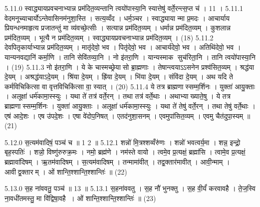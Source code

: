 5.11.0
स्वाद्ध्यायप्रवचनाभ्यान्न प्रम॑दित॒व्यन्तानि त्वयो॑पास्या॒नि स्यात्तेषु॑ वर्ते॒रन्त्स॒प्त च॑ । 11 ।
5.11.1
वेदमनूच्याचार्योऽन्तेवासिनम॑नुशा॒स्ति । सत्य॒व्वँद । धर्म॒ञ्चर । स्वाद्ध्यायान्मा प्र॒मदः । आचार्याय प्रियन्धनमाहृत्य प्रजातन्तुं मा व्य॑वच्छे॒त्सीः । सत्यान्न प्रम॑दित॒व्यम् । धर्मान्न प्रम॑दित॒व्यम् । कुशलान्न प्रम॑दित॒व्यम् । भूत्यै न प्रम॑दित॒व्यम् । स्वाद्ध्यायप्रवचनाभ्यान्न प्रम॑दित॒व्यम् । (18)
5.11.2
देवपितृकार्याभ्यान्न प्रम॑दित॒व्यम् । मातृ॑देवो॒ भव । पितृ॑देवो॒ भव । आचार्य॑देवो॒ भव । अतिथि॑देवो॒ भव । यान्यनवद्यानि॑ कर्मा॒णि । तानि सेवि॑तव्या॒नि । नो इ॑तरा॒णि । यान्यस्माक सुच॑रिता॒नि । तानि त्वयो॑पास्या॒नि । (19)
5.11.3
नो इ॑तरा॒णि । ये के चास्मच्छ्रेयासो ब्रा॒ह्मणाः । तेषान्त्वयाऽऽसनेन प्रश्व॑सित॒व्यम् । श्रद्ध॑या दे॒यम् । अश्रद्ध॑याऽदे॒यम् । श्रि॑या दे॒यम् । ह्रि॑या दे॒यम् । भि॑या दे॒यम् । संवि॑दा दे॒यम् । अथ यदि ते कर्मविचिकित्सा वा वृत्तविचिकि॑त्सा वा॒ स्यात् । (20)
5.11.4
ये तत्र ब्राह्मणास्सम्म॒र्\mbox{}शिनः । युक्ता॑ आयु॒क्ताः । अलूक्षा॑ धर्म॑कामा॒स्स्युः । यथा ते॑ तत्र॑ वर्ते॒रन् । तथा तत्र॑ वर्ते॒थाः । अथाभ्याख्याते॒षु । ये तत्र ब्राह्मणास्सम्म॒र्\mbox{}शिनः । युक्ता॑ आयु॒क्ताः । अलूक्षा॑ धर्म॑कामा॒स्स्युः । यथा ते॑ तेषु॑ वर्ते॒रन् । तथा तेषु॑ वर्ते॒थाः । एष॑ आदे॒शः । एष उ॑पदे॒शः । एषा वे॑दोप॒निषत् । एतद॑नुशा॒सनम् । एवमुपा॑सित॒व्यम् । एवमु चैत॑दुपा॒स्यम् ॥ (21)
\anuvakamend

5.12.0
स॒त्यम॑वादिषं॒ पञ्च॑ च ॥ 1 2 ॥
5.12.1
शन्नो॑ मि॒त्रश्शव्वँरु॑णः । शन्नो॑ भवत्वर्य॒मा । शन्न॒ इन्द्रो॒ बृह॒स्पतिः॑ । शन्नो॒ विष्णु॑रुरुक्र॒मः । नमो॒ ब्रह्म॑णे । नम॑स्ते वायो । त्वमे॒व प्र॒त्यक्षं॒ ब्रह्मा॑सि । त्वामे॒व प्र॒त्यक्षं॒ ब्रह्मावा॑दिषम् । ऋ॒तम॑वादिषम् । स॒त्यम॑वादिषम् । तन्मामा॑वीत् । तद्व॒क्तार॑मावीत् । आवी॒न्माम् । आवीद्व॒क्तारम् । ओं शान्ति॒श्शान्ति॒श्शान्तिः॑ ॥ (22)

\setcounter{anuvakam}{0}
5.13.0
स॒ह ना॑ववतु॒ पञ्च॑ ॥ 13 ॥
5.13.1
स॒हना॑ववतु । स॒ह नौ॑ भुनक्तु । स॒ह वी॒र्यं॑ करवावहै । ते॒ज॒स्वि ना॒वधी॑तमस्तु॒ मा वि॑द्विषा॒वहै । ओं शान्ति॒श्शान्ति॒श्शान्तिः॑ ॥ (23)
\anuvakamend


